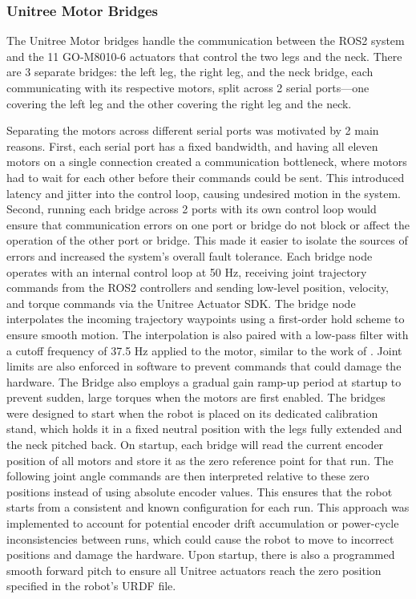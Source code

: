 \subsubsection*{Unitree Motor Bridges}
The Unitree Motor bridges handle the communication between the ROS2 system and the 11 GO-M8010-6 actuators that control the two legs and the neck. There are 3 separate bridges: the left leg, the right leg, and the neck bridge, each communicating with its respective motors, split across 2 serial ports—one covering the left leg and the other covering the right leg and the neck.

Separating the motors across different serial ports was motivated by 2 main reasons. First, each serial port has a fixed bandwidth, and having all eleven motors on a single connection created a communication bottleneck, where motors had to wait for each other before their commands could be sent. This introduced latency and jitter into the control loop, causing undesired motion in the system. Second, running each bridge across 2 ports with its own control loop would ensure that communication errors on one port or bridge do not block or affect the operation of the other port or bridge. This made it easier to isolate the sources of errors and increased the system's overall fault tolerance.
Each bridge node operates with an internal control loop at 50 Hz, receiving joint trajectory commands from the ROS2 controllers and sending low-level position, velocity, and torque commands via the Unitree Actuator SDK. The bridge node interpolates the incoming trajectory waypoints using a first-order hold scheme to ensure smooth motion. The interpolation is also paired with a low-pass filter with a cutoff frequency of 37.5 Hz applied to the motor, similar to the work of \cite{grandia_design_2024}. Joint limits are also enforced in software to prevent commands that could damage the hardware. The Bridge also employs a gradual gain ramp-up period at startup to prevent sudden, large torques when the motors are first enabled.
The bridges were designed to start when the robot is placed on its dedicated calibration stand, which holds it in a fixed neutral position with the legs fully extended and the neck pitched back. On startup, each bridge will read the current encoder position of all motors and store it as the zero reference point for that run. The following joint angle commands are then interpreted relative to these zero positions instead of using absolute encoder values. This ensures that the robot starts from a consistent and known configuration for each run. This approach was implemented to account for potential encoder drift accumulation or power-cycle inconsistencies between runs, which could cause the robot to move to incorrect positions and damage the hardware. Upon startup, there is also a programmed smooth forward pitch to ensure all Unitree actuators reach the zero position specified in the robot's URDF file. 

